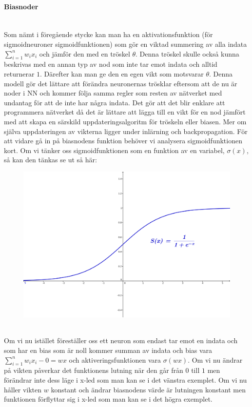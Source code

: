 \documentclass[a4paper,10pt]{article}
\begin{document}
\paragraph{Biasnoder}\hspace{0pt}\\
Som nämt i föregående stycke kan man ha en aktivationsfunktion (för sigmoidneuroner sigmoidfunktionen) som gör en viktad summering av alla indata $\sum_{i=1}^{n} {w_ix_i}$ och jämför den med en tröskel $\theta$. Denna tröskel skulle också kunna beskrivas med en annan typ av nod som inte tar emot indata och alltid returnerar $1$. Därefter kan man ge den en egen vikt som motsvarar $\theta$. Denna modell gör det lättare att förändra neuronernas trösklar eftersom att de nu är noder i NN och kommer följa samma regler som resten av nätverket med undantag för att de inte har några indata. Det gör att det blir enklare att programmera nätverket då det är lättare att lägga till en vikt för en nod jämfört med att skapa en särskild uppdateringsalgoritm för tröskeln eller biasen. Mer om själva uppdateringen av vikterna ligger under inlärning och backpropagation. För att vidare gå in på biasnodens funktion behöver vi analysera sigmoidfunktionen kort. Om vi tänker oss sigmoidfunktionen som en funktion av en variabel, $\sigma(x)$, så kan den tänkas se ut så här:
\begin{figure}[ht]
\includegraphics{Sigmoid}\centering
\end{figure}\\
Om vi nu istället föreställer oss ett neuron som endast tar emot en indata och som har en bias som är noll kommer summan av indata och bias vara $\sum_{i=1}^{n} {w_ix_i} -0=wx$ och aktiveringsfunktionen vara $\sigma(wx)$. Om vi nu ändrar på vikten påverkar det funktionens lutning när den går från $0$ till $1$ men förändrar inte dess läge i x-led som man kan se i det vänstra exemplet. Om vi nu håller vikten $w$ konstant och ändrar biasnodens värde är lutningen konstant men funktionen förflyttar sig i x-led som man kan se i det högra exemplet.
\end{document}
